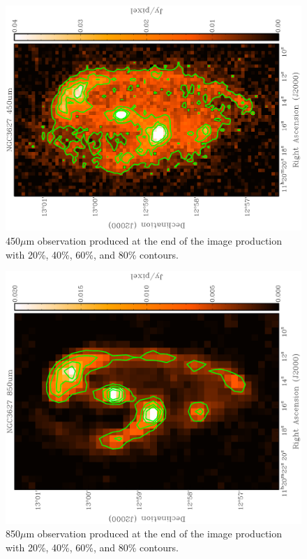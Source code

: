 \begin{figure}
  \centering
  \includegraphics[width=1.\textwidth,angle=270]{obs_imgs/450_um.eps}
  \caption[NGC3627 450$\mu$m Observations]{450$\mu$m observation produced at the end of the image production with 20\%, 40\%, 60\%, and 80\% contours.}
    \label{fig_450}
\end{figure}

\begin{figure}
  \centering
  \includegraphics[width=1.\textwidth,angle=270]{obs_imgs/850_um.eps}
  \caption[NGC3627 850$\mu$m Observations]{850$\mu$m observation produced at the end of the image production with 20\%, 40\%, 60\%, and 80\% contours.}
    \label{fig_850}
\end{figure}

